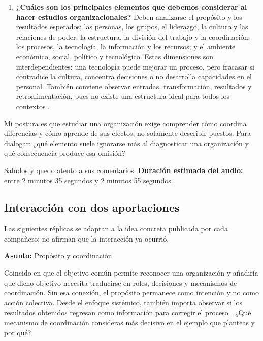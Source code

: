 \documentclass[spanish,letterpaper,oneside]{article}
\begin{document}
\begin{forobox}[title={Intervención en el foro sobre la organización}]
\begin{enumerate}[leftmargin=1.6em,labelsep=0.6em,itemsep=0.7em,label=\textbf{\arabic*)}]
  \item \textbf{¿Cuáles son los principales elementos que debemos considerar al hacer estudios organizacionales?} Deben analizarse el propósito y los resultados esperados; las personas, los grupos, el liderazgo, la cultura y las relaciones de poder; la estructura, la división del trabajo y la coordinación; los procesos, la tecnología, la información y los recursos; y el ambiente económico, social, político y tecnológico. Estas dimensiones son interdependientes: una tecnología puede mejorar un proceso, pero fracasar si contradice la cultura, concentra decisiones o no desarrolla capacidades en el personal. También conviene observar entradas, transformación, resultados y retroalimentación, pues no existe una estructura ideal para todos los contextos \citep{bright2019,openstaxEnvironment2019,openstaxStructures2019}.
\end{enumerate}
\medskip
Mi postura es que estudiar una organización exige comprender cómo coordina diferencias y cómo aprende de sus efectos, no solamente describir puestos. Para dialogar: ¿qué elemento suele ignorarse más al diagnosticar una organización y qué consecuencia produce esa omisión?\par
\medskip
Saludos y quedo atento a sus comentarios.
\medskip
\textbf{Duración estimada del audio:} entre 2 minutos 35 segundos y 2 minutos 55 segundos.
\end{forobox}

\subsection{Interacción con dos aportaciones}

Las siguientes réplicas se adaptan a la idea concreta publicada por cada compañero; no afirman que la interacción ya ocurrió.

\begin{forobox}[title={Primera retroalimentación para adaptar y publicar}]
\textbf{Asunto:} Propósito y coordinación\par
\medskip
Coincido en que el objetivo común permite reconocer una organización y añadiría que dicho objetivo necesita traducirse en roles, decisiones y mecanismos de coordinación. Sin esa conexión, el propósito permanece como intención y no como acción colectiva. Desde el enfoque sistémico, también importa observar si los resultados obtenidos regresan como información para corregir el proceso \citep{kastRosenzweig1972}. ¿Qué mecanismo de coordinación consideras más decisivo en el ejemplo que planteas y por qué?
\end{forobox}
\end{document}
